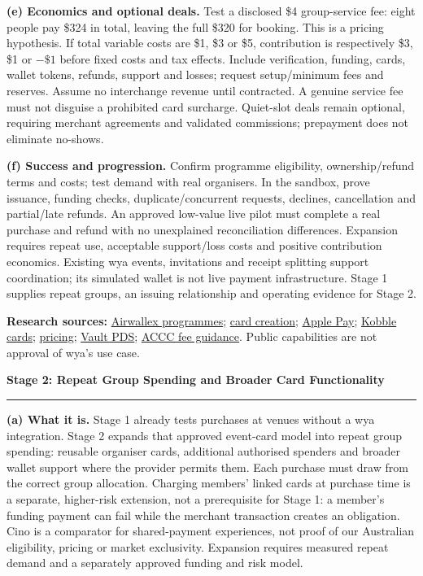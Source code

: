 \documentclass[10pt, a4paper]{report}
\newcommand{\qtitle}[1]{%
    \vspace{0.4em}%
    \noindent\textbf{\large #1}\par%
    \vspace{-1.5em}%
    \noindent\rule{\linewidth}{0.8pt}%
    \vspace{0.1em}%
}
\begin{document}
\textbf{(e) Economics and optional deals.} Test a disclosed \$4 group-service fee: eight people pay \$324 in total, leaving the full \$320 for booking. This is a pricing hypothesis. If total variable costs are \$1, \$3 or \$5, contribution is respectively \$3, \$1 or $-\$1$ before fixed costs and tax effects. Include verification, funding, cards, wallet tokens, refunds, support and losses; request setup/minimum fees and reserves. Assume no interchange revenue until contracted. A genuine service fee must not disguise a prohibited card surcharge. Quiet-slot deals remain optional, requiring merchant agreements and validated commissions; prepayment does not eliminate no-shows.

\textbf{(f) Success and progression.} Confirm programme eligibility, ownership/refund terms and costs; test demand with real organisers. In the sandbox, prove issuance, funding checks, duplicate/concurrent requests, declines, cancellation and partial/late refunds. An approved low-value live pilot must complete a real purchase and refund with no unexplained reconciliation differences. Expansion requires repeat use, acceptable support/loss costs and positive contribution economics. Existing wya events, invitations and receipt splitting support coordination; its simulated wallet is not live payment infrastructure. Stage 1 supplies repeat groups, an issuing relationship and operating evidence for Stage 2.

{\footnotesize{}
\textbf{Research sources:} \href{https://www.airwallex.com/docs/issuing/supported-card-programs}{Airwallex programmes}; \href{https://www.airwallex.com/docs/issuing/get-started/create-cards/create-consumer-cards}{card creation}; \href{https://www.airwallex.com/docs/issuing/card-branding/whitelabel-digital-wallets}{Apple Pay}; \href{https://www.kobble.net/platform/cards}{Kobble cards}; \href{https://www.kobble.net/pricing}{pricing}; \href{https://www.vaultps.com.au/reloadableol_pds/}{Vault PDS}; \href{https://www.accc.gov.au/business/pricing/card-surcharges}{ACCC fee guidance}. Public capabilities are not approval of wya's use case.\par}

\clearpage
\qtitle{Stage 2: Repeat Group Spending and Broader Card Functionality}

\textbf{(a) What it is.} Stage 1 already tests purchases at venues without a wya integration. Stage 2 expands that approved event-card model into repeat group spending: reusable organiser cards, additional authorised spenders and broader wallet support where the provider permits them. Each purchase must draw from the correct group allocation. Charging members' linked cards at purchase time is a separate, higher-risk extension, not a prerequisite for Stage 1: a member's funding payment can fail while the merchant transaction creates an obligation. Cino is a comparator for shared-payment experiences, not proof of our Australian eligibility, pricing or market exclusivity. Expansion requires measured repeat demand and a separately approved funding and risk model.
\end{document}

